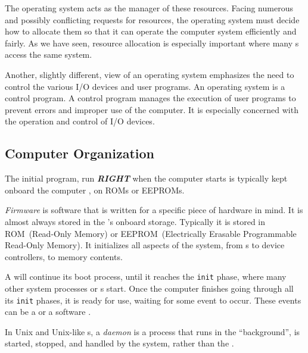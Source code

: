 The operating system acts as the manager of these resources.
Facing numerous and possibly conflicting requests for resources, the operating system must decide how to allocate them so that it can operate the computer system efficiently and fairly.
As we have seen, resource allocation is especially important where many s access the same system.

Another, slightly different, view of an operating system emphasizes the need to control the various I/O devices and user programs.
An operating system is a control program.
A control program manages the execution of user programs to prevent errors and improper use of the computer.
It is especially concerned with the operation and control of I/O devices.

\subsection{Computer Organization}\label{subsec:Computer_Organization}
The initial program, run \textbf{\emph{RIGHT}} when the computer starts is typically kept onboard the computer , on ROMs or EEPROMs.

\begin{definition}[Firmware]\label{def:Firmware}
  \emph{Firmware} is software that is written for a specific piece of hardware in mind.
  It is almost always stored in the 's onboard storage.
  Typically it is stored in ROM~(Read-Only Memory) or EEPROM~(Electrically Erasable Programmable Read-Only Memory).
  It initializes all aspects of the system, from  s to device controllers, to memory contents.
\end{definition}

A  will continue its boot process, until it reaches the \texttt{init} phase, where many other system processes or s start.
Once the computer finishes going through all its \texttt{init} phases, it is ready for use, waiting for some event to occur.
These events can be a   or a software .

\begin{definition}[Daemon]\label{def:Daemon}
  In Unix and Unix-like s, a \emph{daemon} is a process that runs in the ``background'', is started, stopped, and handled by the system, rather than the .
\end{definition}

